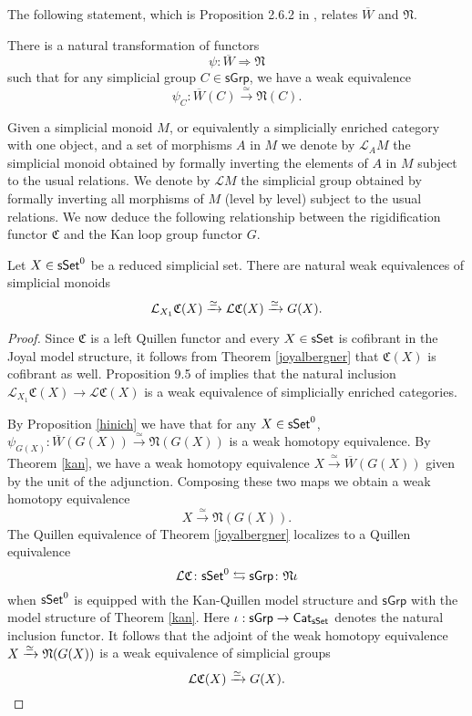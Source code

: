 The following statement, which is Proposition 2.6.2 in \cite{hinich2007deformation}, relates $\overline{W}$ and $\mathfrak{N}$.

\begin{proposition}\label{hinich} There is a natural transformation of functors $$\psi: \overline{W} \Longrightarrow \mathfrak{N}$$ such that for any simplicial group $C \in \mathsf{sGrp}$, we have a weak equivalence
$$\psi_C: \overline{W}(C) \xrightarrow{\simeq} \mathfrak{N}(C).$$
\end{proposition} 

 Given a simplicial monoid $M$, or equivalently a simplicially enriched category with one object, and a set of morphisms $A$ in $M$ we denote by $\mathcal{L}_A M$ the simplicial monoid obtained by formally inverting the elements of $A$ in $M$ subject to the usual relations. We denote by $\mathcal{L}M$ the simplicial group obtained by formally inverting all morphisms of $M$ (level by level) subject to the usual relations. We now deduce the following relationship between the rigidification functor $\mathfrak{C}$ and the Kan loop group functor $G$.

\begin{proposition} Let $X \in \mathsf{sSet}^0$ be a reduced simplicial set. There are natural weak equivalences of simplicial monoids
$$\mathcal{L}_{X_1} \mathfrak{C}(X) \xrightarrow{\simeq} \mathcal{L}\mathfrak{C}(X) \xrightarrow{\simeq} G(X).$$
\end{proposition}

\begin{proof}
Since $\mathfrak{C}$ is a left Quillen functor and every $X \in \mathsf{sSet}$ is cofibrant in the Joyal model structure, it follows from Theorem \ref{joyalbergner} that $\mathfrak{C}(X)$ is cofibrant as well. Proposition 9.5 of \cite{dwyer1980simplicial} implies that the natural inclusion $\mathcal{L}_{X_1} \mathfrak{C}(X) \to \mathcal{L}\mathfrak{C}(X)$ is a weak equivalence of simplicially enriched categories. 

By Proposition \ref{hinich} we have that for any $X \in \mathsf{sSet}^0$, $\psi_{G(X)}: \overline{W}(G(X)) \xrightarrow{\simeq} \mathfrak{N}(G(X))$ is a weak homotopy equivalence. By Theorem \ref{kan}, we have a weak homotopy equivalence $X \xrightarrow{\simeq} \overline{W}(G(X))$ given by the unit of the adjunction. Composing these two maps we obtain a weak homotopy equivalence
$$X \xrightarrow{\simeq} \mathfrak{N}(G(X)).$$ 
The Quillen equivalence of Theorem \ref{joyalbergner} localizes to a Quillen equivalence
$$\mathcal{L} \mathfrak{C} \colon \mathsf{sSet}^0 \leftrightarrows \mathsf{sGrp} \colon \mathfrak{N}\iota$$
when $\mathsf{sSet}^0$ is equipped with the Kan-Quillen model structure and $\mathsf{sGrp}$ with the model structure of Theorem \ref{kan}. Here $\iota: \mathsf{sGrp} \to \mathsf{Cat}_{\mathsf{sSet}}$ denotes the natural inclusion functor. It follows that the adjoint of the weak homotopy equivalence $X \xrightarrow{\simeq} \mathfrak{N}(G(X))$ is a weak equivalence of simplicial groups
$$\mathcal{L}\mathfrak{C}(X) \xrightarrow{\simeq} G(X).$$ 
\end{proof}

